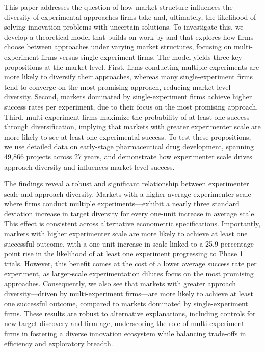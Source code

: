 
This paper addresses the question of how market structure influences the diversity of experimental approaches firms take and, ultimately, the likelihood of solving innovation problems with uncertain solutions. To investigate this, we develop a theoretical model that builds on work by \citet{dasgupta1987simple} and \citet{bryan2017direction} that explores how firms choose between approaches under varying market structures, focusing on multi-experiment firms versus single-experiment firms. The model yields three key propositions at the market level. First, firms conducting multiple experiments are more likely to diversify their approaches, whereas many single-experiment firms tend to converge on the most promising approach, reducing market-level diversity. Second, markets dominated by single-experiment firms achieve higher success rates per experiment, due to their focus on the most promising approach. Third, multi-experiment firms maximize the probability of at least one success through diversification, implying that markets with greater experimenter scale are more likely to see at least one experimental success. To test these propositions, we use detailed data on early-stage pharmaceutical drug development, spanning 49,866 projects across 27 years, and demonstrate how experimenter scale drives approach diversity and influences market-level success.

The findings reveal a robust and significant relationship between experimenter scale and approach diversity. Markets with a higher average experimenter scale---where firms conduct multiple experiments---exhibit a nearly three standard deviation increase in target diversity for every one-unit increase in average scale. This effect is consistent across alternative econometric specifications. Importantly, markets with higher experimenter scale are more likely to achieve at least one successful outcome, with a one-unit increase in scale linked to a 25.9 percentage point rise in the likelihood of at least one experiment progressing to Phase 1 trials. However, this benefit comes at the cost of a lower average success rate per experiment, as larger-scale experimentation dilutes focus on the most promising approaches. Consequently, we also see that markets with greater approach diversity---driven by multi-experiment firms---are more likely to achieve at least one successful outcome, compared to markets dominated by single-experiment firms. These results are robust to alternative explanations, including controls for new target discovery and firm age, underscoring the role of multi-experiment firms in fostering a diverse innovation ecosystem while balancing trade-offs in efficiency and exploratory breadth. 

